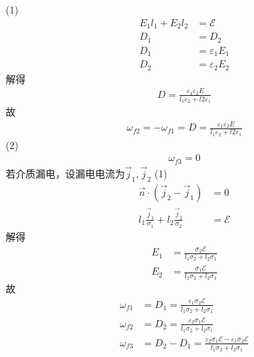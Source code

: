 \documentclass{phyasgn}
\begin{document}
\begin{sol}[3]
    (1)\begin{align*}
        E_1l_1+E_2l_2&=\mathscr{E}\\
        D_1&=D_2\\
        D_1&=\varepsilon_1E_1\\
        D_2&=\varepsilon_2E_2
    \end{align*}
    解得
    \begin{align*}
        D=\frac{\varepsilon_1\varepsilon_2E}{l_1\varepsilon_2+l2\varepsilon_1}
    \end{align*}
    故
    \begin{align*}
        \omega_{f2}=-\omega_{f1}=D=\frac{\varepsilon_1\varepsilon_2E}{l_1\varepsilon_2+l2\varepsilon_1}
    \end{align*}
    (2)
    \begin{align*}
        \omega_{f3}=0
    \end{align*}
    若介质漏电，设漏电电流为$\vec{j}_1,\vec{j}_2$
    (1)\begin{align*}
        \vec{n}\cdot(\vec{j}_2-\vec{j}_1)&=0\\
        l_1\frac{\vec{j}_1}{\sigma_1}+l_2\frac{\vec{j}_2}{\sigma_2}&=\mathscr{E}
    \end{align*}
    解得
    \begin{align*}
        E_1&=\frac{\sigma_2\mathscr{E}}{l_1\sigma_2+l_2\sigma_1}\\
        E_2&=\frac{\sigma_1\mathscr{E}}{l_1\sigma_2+l_2\sigma_1}
    \end{align*}
    故
    \begin{align*}
        \omega_{f1}&=D_1=\frac{\varepsilon_1\sigma_2\mathscr{E}}{l_1\sigma_2+l_2\sigma_1}\\
        \omega_{f2}&=D_2=\frac{\varepsilon_2\sigma_1\mathscr{E}}{l_1\sigma_2+l_2\sigma_1}\\
        \omega_{f3}&=D_2-D_1=\frac{\varepsilon_2\sigma_1\mathscr{E}-\varepsilon_1\sigma_2\mathscr{E}}{l_1\sigma_2+l_2\sigma_1}\\
    \end{align*}
\end{sol}\par
\end{document}
